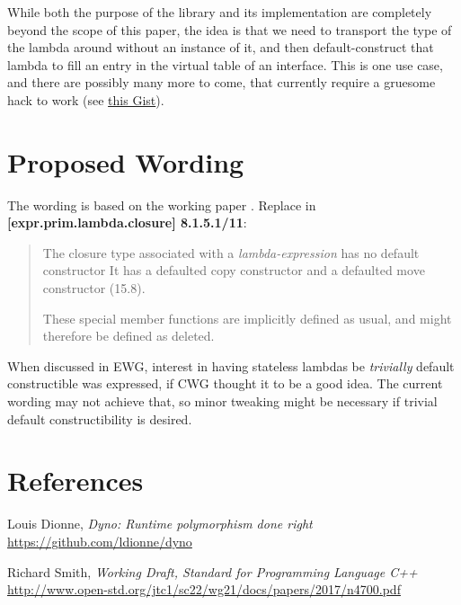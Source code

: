 \documentclass{wg21}
\begin{document}
While both the purpose of the library and its implementation are completely
beyond the scope of this paper, the idea is that we need to transport the
type of the lambda around without an instance of it, and then default-construct
that lambda to fill an entry in the virtual table of an interface. This is one
use case, and there are possibly many more to come, that currently require a
gruesome hack to work (see \href{https://github.com/ldionne/dyno/blob/03eaeded898225660787f03655edb89642a72e7c/include/dyno/detail/empty_object.hpp#L13}{this Gist}).


\section{Proposed Wording}
The wording is based on the working paper \cite{N4700}. Replace in
\textbf{[expr.prim.lambda.closure] 8.1.5.1/11}:

\begin{quote}
  The closure type associated with a \textit{lambda-expression} has no default
  constructor  
  It has a defaulted copy constructor and a defaulted move constructor (15.8).
  \begin{note}
  These special member functions are implicitly defined as usual, and might
  therefore be defined as deleted.
  \end{note}
\end{quote}

When discussed in EWG, interest in having stateless lambdas be \textit{trivially}
default constructible was expressed, if CWG thought it to be a good idea. The
current wording may not achieve that, so minor tweaking might be necessary if
trivial default constructibility is desired.


\section{References}
\renewcommand{\section}[2]{}%
\begin{thebibliography}{9}

    Louis Dionne,
    \emph{Dyno: Runtime polymorphism done right}\newline
    \url{https://github.com/ldionne/dyno}

    Richard Smith,
    \emph{Working Draft, Standard for Programming Language C++}\newline
    \url{http://www.open-std.org/jtc1/sc22/wg21/docs/papers/2017/n4700.pdf}

\end{thebibliography}
\end{document}
